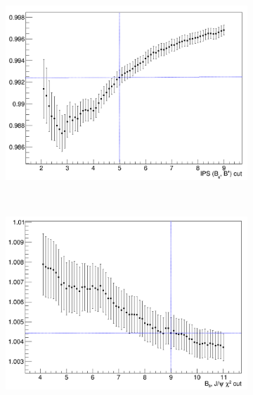 \begin{figure}
    \centering
    \begin{subfigure}[b]{0.4\textwidth}
        \includegraphics[width=\textwidth]{./Figs/Selection/IPS.png}
        \caption{ }
        \label{fig:IPS_ratio}
    \end{subfigure}
    ~ %
    \begin{subfigure}[b]{0.4\textwidth}
        \includegraphics[width=\textwidth]{./Figs/Selection/CHI2.png}
        \caption{ }
        \label{fig:CHI2_ratio}
    \end{subfigure}
    ~ %


\end{figure}
